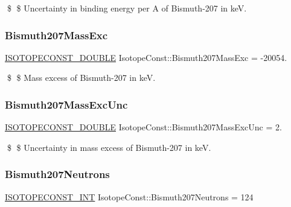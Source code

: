 \$ \$ Uncertainty in binding energy per A of Bismuth-\/207 in keV. \mbox{\label{group___isotope_const-_bismuth-_bi207_ga6332e04734b6033717883d9f8ae7aea6}} 
\subsubsection{\texorpdfstring{Bismuth207\+Mass\+Exc}{Bismuth207MassExc}}
{\footnotesize\ttfamily \mbox{\hyperlink{group___isotope_const-_macros_ga8f45a7272ce02c0b4c65c44636ed719a}{I\+S\+O\+T\+O\+P\+E\+C\+O\+N\+S\+T\+\_\+\+D\+O\+U\+B\+LE}} Isotope\+Const\+::\+Bismuth207\+Mass\+Exc = -\/20054.}

\$ \$ Mass excess of Bismuth-\/207 in keV. \mbox{\label{group___isotope_const-_bismuth-_bi207_gad4676bd106d36f199c94293548f9f494}} 
\subsubsection{\texorpdfstring{Bismuth207\+Mass\+Exc\+Unc}{Bismuth207MassExcUnc}}
{\footnotesize\ttfamily \mbox{\hyperlink{group___isotope_const-_macros_ga8f45a7272ce02c0b4c65c44636ed719a}{I\+S\+O\+T\+O\+P\+E\+C\+O\+N\+S\+T\+\_\+\+D\+O\+U\+B\+LE}} Isotope\+Const\+::\+Bismuth207\+Mass\+Exc\+Unc = 2.}

\$ \$ Uncertainty in mass excess of Bismuth-\/207 in keV. \mbox{\label{group___isotope_const-_bismuth-_bi207_gafd20c176d78c9911e278939add73dc23}} 
\subsubsection{\texorpdfstring{Bismuth207\+Neutrons}{Bismuth207Neutrons}}
{\footnotesize\ttfamily \mbox{\hyperlink{group___isotope_const-_macros_ga5f18360b3e99483a35c32d789e62621c}{I\+S\+O\+T\+O\+P\+E\+C\+O\+N\+S\+T\+\_\+\+I\+NT}} Isotope\+Const\+::\+Bismuth207\+Neutrons = 124}


